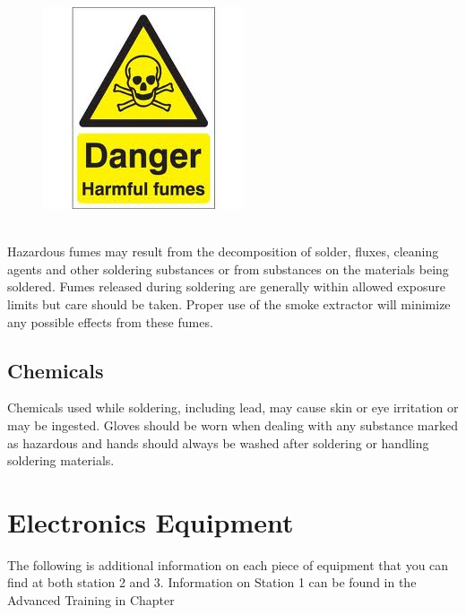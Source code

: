 \begin{framed}
\begin{figure}
\includegraphics[width=\linewidth]{images/fumes_hazard.jpg}
\end{figure}
\ \\
Hazardous fumes may result from the decomposition of solder, fluxes, cleaning agents and other soldering substances or from substances on the materials being soldered. Fumes released during soldering are generally within allowed exposure limits but care should be taken.  Proper use of the smoke extractor will minimize any possible effects from these fumes.
\end{framed}

\subsection{Chemicals}
Chemicals used while soldering, including lead, may cause skin or eye irritation or may be ingested. Gloves should be worn when dealing with any substance marked as hazardous and hands should always be washed after soldering or handling soldering materials.

\section{Electronics Equipment}
The following is additional information on each piece of equipment that you can find at both station 2 and 3.  Information on Station 1 can be found in the Advanced Training in Chapter 

